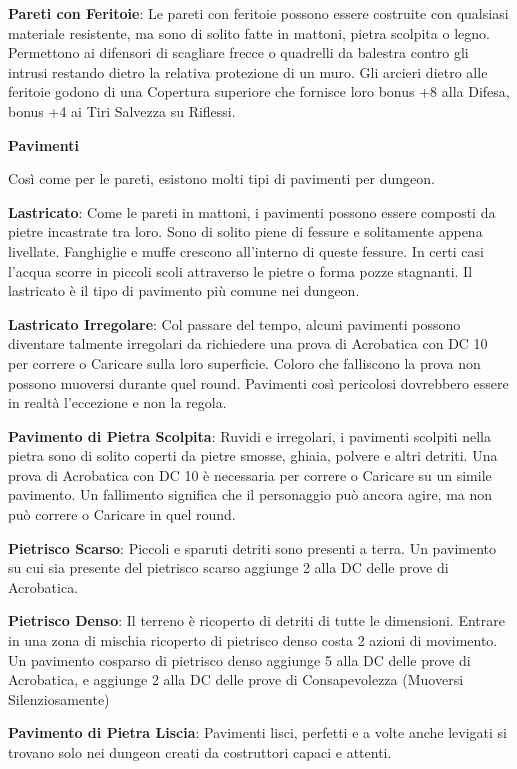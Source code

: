 \documentclass[a4paper,11pt,twoside,openany]{book}
\begin{document}
\textbf{Pareti con Feritoie}: Le pareti con feritoie possono essere costruite con qualsiasi materiale resistente, ma sono di solito fatte in mattoni, pietra scolpita o legno. Permettono ai difensori di scagliare frecce o quadrelli da balestra contro gli intrusi restando dietro la relativa protezione di un muro. Gli arcieri dietro alle feritoie godono di una Copertura superiore che fornisce loro bonus +8 alla Difesa, bonus +4 ai Tiri Salvezza su Riflessi.

\textbf{Pavimenti}

Così come per le pareti, esistono molti tipi di pavimenti per dungeon.

\textbf{Lastricato}: Come le pareti in mattoni, i pavimenti possono essere composti da pietre incastrate tra loro. Sono di solito piene di fessure e solitamente appena livellate. Fanghiglie e muffe crescono all'interno di queste fessure. In certi casi l'acqua scorre in piccoli scoli attraverso le pietre o forma pozze stagnanti. Il lastricato è il tipo di pavimento più comune nei dungeon.

\textbf{Lastricato Irregolare}: Col passare del tempo, alcuni pavimenti possono diventare talmente irregolari da richiedere una prova di Acrobatica con DC 10 per correre o Caricare sulla loro superficie. Coloro che falliscono la prova non possono muoversi durante quel round. Pavimenti così pericolosi dovrebbero essere in realtà l'eccezione e non la regola.

\textbf{Pavimento di Pietra Scolpita}: Ruvidi e irregolari, i pavimenti scolpiti nella pietra sono di solito coperti da pietre smosse, ghiaia, polvere e altri detriti. Una prova di Acrobatica con DC 10 è necessaria per correre o Caricare su un simile pavimento. Un fallimento significa che il personaggio può ancora agire, ma non può correre o Caricare in quel round.

\textbf{Pietrisco Scarso}: Piccoli e sparuti detriti sono presenti a terra. Un pavimento su cui sia presente del pietrisco scarso aggiunge 2 alla DC delle prove di Acrobatica.

\textbf{Pietrisco Denso}: Il terreno è ricoperto di detriti di tutte le dimensioni. Entrare in una zona di mischia ricoperto di pietrisco denso costa 2 azioni di movimento. Un pavimento cosparso di pietrisco denso aggiunge 5 alla DC delle prove di Acrobatica, e aggiunge 2 alla DC delle prove di Consapevolezza (Muoversi Silenziosamente)

\textbf{Pavimento di Pietra Liscia}: Pavimenti lisci, perfetti e a volte anche levigati si trovano solo nei dungeon creati da costruttori capaci e attenti.
\end{document}
